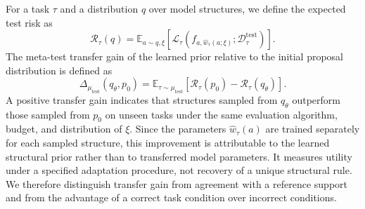 For a task $\tau$ and a distribution $q$ over model structures, we define
the expected test risk as
\[
\mathcal{R}_\tau(q)
=
\mathbb{E}_{a\sim q,\xi}
\left[
  \mathcal{L}_\tau\!\left(
    f_{a,\widehat{w}_\tau(a;\xi)};
    \mathcal{D}^{\mathrm{test}}_\tau
  \right)
\right].
\]
The meta-test transfer gain of the learned prior relative to the initial
proposal distribution is defined as
\[
\Delta_{\mu_{\mathrm{test}}}(q_\theta,p_0)
=
\mathbb{E}_{\tau\sim\mu_{\mathrm{test}}}
\left[
  \mathcal{R}_\tau(p_0)-\mathcal{R}_\tau(q_\theta)
\right].
\]
A positive transfer gain indicates that structures sampled from $q_\theta$
outperform those sampled from $p_0$ on unseen tasks under the same evaluation
algorithm, budget, and distribution of $\xi$. Since the parameters
$\widehat{w}_\tau(a)$ are trained separately for each sampled structure,
this improvement is attributable to the learned structural prior rather
than to transferred model parameters. It measures utility under a specified
adaptation procedure, not recovery of a unique structural rule. We therefore
distinguish transfer gain from agreement with a reference support and from
the advantage of a correct task condition over incorrect conditions.
